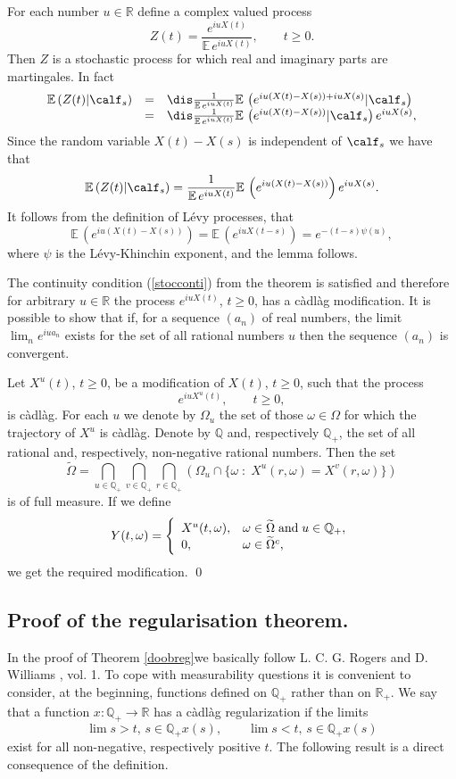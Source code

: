 \documentclass[preprint]{imsart}
\def\E{\mathbb E}
\def\Q{\mathbb Q}
\def\R{\mathbb R}
\begin{document}
{For each number $u\in \R$ define a complex valued process
$$
Z(t)=\frac{e^{iuX(t)}}{\E\, e^{iuX(t)}},
\qquad t\ge0.
$$
Then $Z$ is a stochastic  process for which real and imaginary
parts are martingales. In fact
$$
\begin{array}{lll}
  \E\, (Z(t)|\calf_s) & = & \dis
\frac{1}{\E\, e^{iuX(t)}} \E\, \left(
e^{iu(X(t)-X(s))+iuX(s)}|\calf_s\right)
   \\
    & = & \dis
   \frac{1}{\E\, e^{iuX(t)}}
    \E\, \left( e^{iu(X(t)-X(s))}|\calf_s\right)
   e^{iuX(s)},
\end{array}
$$
Since the random variable $X(t)-X(s)$ is independent
of $\calf_s$ we have that
$$
  \E\, (Z(t)|\calf_s)  =
  \frac{1}{\E\, e^{iuX(t)}}
    \E\, \left( e^{iu(X(t)-X(s))}\right)
   e^{iuX(s)}.
   $$
It follows from the definition of L\'evy processes, that
$$
    \E\, \left( e^{iu(X(t)-X(s))}\right)=
     \E\, \left( e^{iuX(t-s)}\right)=
 e^{-(t-s)\psi (u)},
   $$
where $\psi$ is the L\'evy-Khinchin exponent, and the lemma
follows.

The continuity condition (\ref{stocconti}) from the theorem is
satisfied and therefore for arbitrary $u\in\R$ the process
$e^{iuX(t)}$, $t\ge0$, has a c\`adl\`ag modification. It is
possible to show that if, for a sequence $(a_n)$ of real numbers,
the limit $\lim_n e^{iua_n}$ exists for the set of all rational
numbers $u$ then the sequence $(a_n)$ is convergent.

Let $X^u(t)$, $t\ge0$, be a modification of $X(t)$, $t\ge 0$, such
that the process
$$
e^{iuX^u(t)},\qquad t\ge0,
$$
is c\`adl\`ag. For each $u$ we denote by $\Omega_u$ the set of
those $\omega\in\Omega$ for which the trajectory of $X^u$ is
c\`adl\`ag. Denote by $\Q$ and, respectively $\Q_+$, the set of all
rational and, respectively, non-negative rational numbers.
Then the set
$$
\widetilde{\Omega}=\bigcap_{u\in\Q_+}\bigcap_{v\in\Q_+}
\bigcap_{r\in\Q_+} \left(\Omega_u \cap
\{\omega\; :\; X^u(r,\omega)=X^v(r,\omega)\}\right)
$$
is of full measure. If we define
$$
Y(t,\omega)= \left\{
\begin{array}{ll}
  X^u(t,\omega), & \omega\in\widetilde{\Omega}
  {\rm \; and\;} u\in \Q_+, \\
  0, & \omega\in\widetilde{\Omega}^c,
\end{array}
\right.
$$
we get the required modification.
\qed


\subsection{Proof of the regularisation theorem.}
In the proof of Theorem \ref{doobreg}we basically follow  L. C. G. Rogers and D. Williams \cite{rogers}, vol. 1.
To cope with measurability questions it is convenient to
consider, at the beginning, functions defined on $\Q_+$ rather
than on $\R_+$. We say that a function $x:\Q_+\to \R$ has
a c\`adl\`ag regularization if the limits
$$
\lim{s>t,\, s\in \Q_+}x(s),
\qquad
\lim{s<t,\, s\in \Q_+}x(s)
$$
exist for all non-negative, respectively positive $t$.
The following result is a direct consequence of the definition.

}
\end{document}
